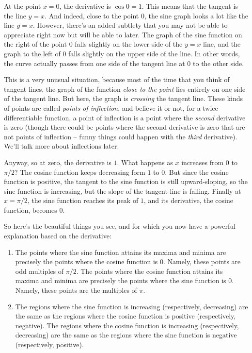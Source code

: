 \documentclass[10pt]{amsart}
\begin{document}
At the point $x = 0$, the derivative is $\cos 0 = 1$. This means that
the tangent is the line $y = x$. And indeed, close to the point $0$,
the sine graph looks a lot like the line $y = x$. However, there's an
added subtlety that you may not be able to appreciate right now but
will be able to later. The graph of the sine function on the right of
the point $0$ falls slightly on the lower side of the $y = x$ line,
and the graph to the left of $0$ falls slightly on the upper side of
the line. In other words, the curve actually passes from one side of
the tangent line at $0$ to the other side.

This is a very unusual situation, because most of the time that you
think of tangent lines, the graph of the function {\em close to the
point} lies entirely on one side of the tangent line. But here, the
graph is {\em crossing} the tangent line. These kinds of points are
called {\em points of inflection}, and believe it or not, for a twice
differentiable function, a point of inflection is a point where the
{\em second} derivative is zero (though there could be points where
the second derivative is zero that are not points of inflection --
funny things could happen with the {\em third} derivative). We'll talk
more about inflections later.

Anyway, so at zero, the derivative is $1$. What happens as $x$
increases from $0$ to $\pi/2$? The cosine function keeps decreasing
form $1$ to $0$. But since the cosine function is positive, the
tangent to the sine function is still upward-sloping, so the sine
function is increasing, but the slope of the tangent line is
falling. Finally at $x = \pi/2$, the sine function reaches its peak of
$1$, and its derivative, the cosine function, becomes $0$.

So here's the beautiful things you see, and for which you now have a
powerful explanation based on the derivative:

\begin{enumerate}
\item The points where the sine function attains its maxima and minima
  are precisely the points where the cosine function is $0$. Namely,
  these points are odd multiples of $\pi/2$. The points where the
  cosine function attains its maxima and minima are precisely the
  points where the sine function is $0$. Namely, these points are the
  multiples of $\pi$.
\item The regions where the sine function is increasing (respectively,
  decreasing) are the same as the regions where the cosine function is
  positive (respectively, negative). The regions where the cosine
  function is increasing (respectively, decreasing) are the same as
  the regions where the sine function is negative (respectively,
  positive).
\end{enumerate}
\end{document}
